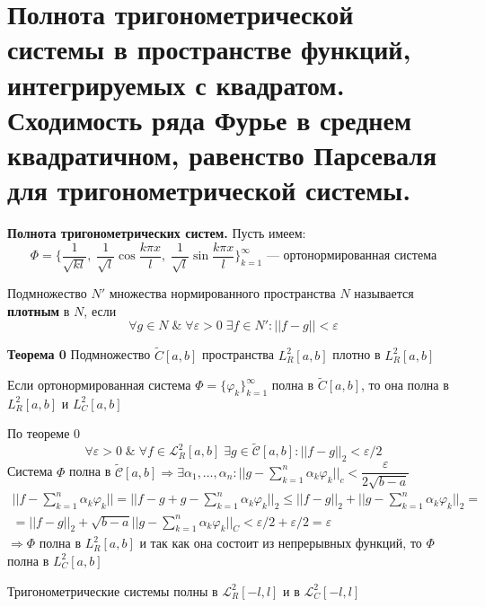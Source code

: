 \section{Полнота тригонометрической системы в пространстве функций, интегрируемых с квадратом. Сходимость ряда Фурье в среднем квадратичном, равенство Парсеваля для тригонометрической системы.}

\textbf{\large Полнота тригонометрических систем.} Пусть имеем:
\[
	\Phi = \{ \dfrac{1}{\sqrt{kl}},\; \dfrac{1}{\sqrt{l}} \cos \dfrac{k\pi x}{l},\; \dfrac{1}{\sqrt{l}}\sin \dfrac{k \pi x}{l} \}_{k=1}^\infty\text{ --- ортонормированная система}
\]
\begin{greyDefinition}
	Подмножество $ N' $ множества нормированного пространства $ N$ называется \textbf{плотным} в $ N $, если 
	\[
		\forall g\in N \;\&\; \forall \varepsilon > 0\; \exists f\in N': ||f-g||<\varepsilon
	\]
\end{greyDefinition}
\begin{greySmth}{\textbf{Теорема 0}}
	Подмножество $ \tilde{C}[a,b]$ пространства $ L_R^2[a,b] $ плотно в $ L_R^2[a,b] $
\end{greySmth}
\begin{greyTheorem}
	Если ортонормированная система $ \Phi = \{ \varphi_k \}_{k=1}^\infty $ полна в $ \tilde{C}[a,b] $, то она полна в $ L_R^2[a,b] \text{ и }L_C^2[a,b]$
\end{greyTheorem}
\begin{greyProof}
	По теореме 0 
	\[
	\forall \varepsilon> 0 \;\&\; \forall f \in \mathcal{L}_R^2 [a,b] \;\exists g \in \tilde{\mathcal{C}}[a,b]: ||f - g ||_2 < \varepsilon/2
	\]
	Система $ \Phi $ полна в $ \tilde{\mathcal{C}}[a,b] \Rightarrow \exists \alpha_1,\ldots,\alpha_n: 
	||g - \sum_{k=1}^n \alpha_k\varphi_k ||_c < \dfrac{\varepsilon}{2\sqrt{b-a}} $
	\begin{multline*}
	||f - \sum_{k=1}^n \alpha_k \varphi_k || = ||f -g +g - \sum_{k=1}^n \alpha_k \varphi_k||_2 \leqslant ||f-g||_2 + ||g - \sum_{k=1}^n \alpha_k \varphi_k||_2 =\\= ||f-g||_2 + \sqrt{b-a}||g -\sum_{k=1}^n \alpha_k\varphi_k||_C < \varepsilon/2 + \varepsilon/2 = \varepsilon
	\end{multline*}
	$ \Rightarrow \Phi$ полна в $ L_R^2[a,b] $ и так как она состоит из непрерывных функций, то $ \Phi $ полна в $ L_C^2[a,b] $
\end{greyProof}
\begin{greyTheorem}
	Тригонометрические системы полны в $ \mathcal{L}_R^2[-l,l] \text{ и в } \mathcal{L}^2_C[-l,l]$
\end{greyTheorem}
